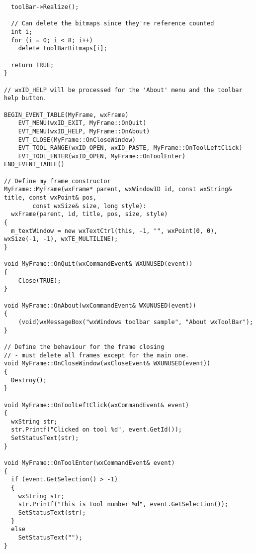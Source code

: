 {\begin{verbatim}
  toolBar->Realize();

  // Can delete the bitmaps since they're reference counted
  int i;
  for (i = 0; i < 8; i++)
    delete toolBarBitmaps[i];

  return TRUE;
}

// wxID_HELP will be processed for the 'About' menu and the toolbar help button.

BEGIN_EVENT_TABLE(MyFrame, wxFrame)
    EVT_MENU(wxID_EXIT, MyFrame::OnQuit)
    EVT_MENU(wxID_HELP, MyFrame::OnAbout)
    EVT_CLOSE(MyFrame::OnCloseWindow)
    EVT_TOOL_RANGE(wxID_OPEN, wxID_PASTE, MyFrame::OnToolLeftClick)
    EVT_TOOL_ENTER(wxID_OPEN, MyFrame::OnToolEnter)
END_EVENT_TABLE()

// Define my frame constructor
MyFrame::MyFrame(wxFrame* parent, wxWindowID id, const wxString& title, const wxPoint& pos,
        const wxSize& size, long style):
  wxFrame(parent, id, title, pos, size, style)
{
  m_textWindow = new wxTextCtrl(this, -1, "", wxPoint(0, 0), wxSize(-1, -1), wxTE_MULTILINE);
}

void MyFrame::OnQuit(wxCommandEvent& WXUNUSED(event))
{
    Close(TRUE);
}

void MyFrame::OnAbout(wxCommandEvent& WXUNUSED(event))
{
    (void)wxMessageBox("wxWindows toolbar sample", "About wxToolBar");
}

// Define the behaviour for the frame closing
// - must delete all frames except for the main one.
void MyFrame::OnCloseWindow(wxCloseEvent& WXUNUSED(event))
{
  Destroy();
}

void MyFrame::OnToolLeftClick(wxCommandEvent& event)
{
  wxString str;
  str.Printf("Clicked on tool %d", event.GetId());
  SetStatusText(str);
}

void MyFrame::OnToolEnter(wxCommandEvent& event)
{
  if (event.GetSelection() > -1)
  {
    wxString str;
    str.Printf("This is tool number %d", event.GetSelection());
    SetStatusText(str);
  }
  else
    SetStatusText("");
}
\end{verbatim}
}

